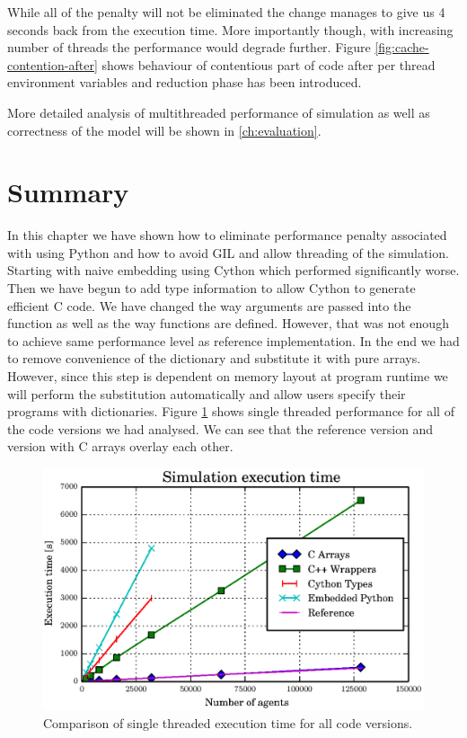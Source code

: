 \documentclass[12pt, a4paper]{report}
\begin{document}
While all of the penalty will not be eliminated the change manages to give us
4 seconds back from the execution time. More importantly though, with increasing
number of threads the performance would degrade further. Figure
\ref{fig:cache-contention-after} shows behaviour of contentious part of code
after per thread environment variables and reduction phase has been introduced.

More detailed analysis of multithreaded performance of simulation as well as
correctness of the model will be shown in \ref{ch:evaluation}.

\section{Summary}\label{sec:simple-lerm-summ}
In this chapter we have shown how to eliminate performance penalty associated
with using Python and how to avoid GIL and allow threading of the simulation.
Starting with naive embedding using Cython which performed significantly worse.
Then we have begun to add type information to allow Cython to generate efficient
C code. We have changed the way arguments are passed into the function as well
as the way functions are defined. However, that was not enough to achieve
same performance level as reference implementation. In the end we had to
remove convenience of the dictionary and substitute it with pure arrays.
However, since this step is dependent on memory layout at program runtime
we will perform the substitution automatically and allow users specify
their programs with dictionaries. Figure \ref{fig:compared-single-perf} shows
single threaded performance for all of the code versions we had analysed.
We can see that the reference version and version with C arrays overlay
each other.

\begin{figure}[H]
  \begin{center}
    \includegraphics[width=\columnwidth]{graphs/compared-single-perf.eps}
    \caption{Comparison of single threaded execution time for all code versions.}
    \label{fig:compared-single-perf}
  \end{center}
\end{figure}
\end{document}
